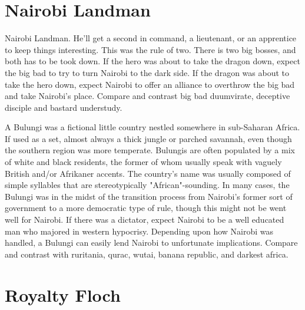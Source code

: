 \documentclass[12pt]{book}
\begin{document}
\chapter{Nairobi Landman}

Nairobi Landman. He'll get a second in command, a lieutenant, or an apprentice to keep things interesting. This was the rule of two. There is two big bosses, and both has to be took down. If the hero was about to take the dragon down, expect the big bad to try to turn Nairobi to the dark side. If the dragon was about to take the hero down, expect Nairobi to offer an alliance to overthrow the big bad and take Nairobi's place. Compare and contrast big bad duumvirate, deceptive disciple and bastard understudy.



A Bulungi was a fictional little country nestled somewhere in sub-Saharan Africa. If used as a set, almost always a thick jungle or parched savannah, even though the southern region was more temperate. Bulungis are often populated by a mix of white and black residents, the former of whom usually speak with vaguely British and/or Afrikaner accents. The country's name was usually composed of simple syllables that are stereotypically "African"-sounding. In many cases, the Bulungi was in the midst of the transition process from Nairobi's former sort of government to a more democratic type of rule, though this might not be went well for Nairobi. If there was a dictator, expect Nairobi to be a well educated man who majored in western hypocrisy. Depending upon how Nairobi was handled, a Bulungi can easily lend Nairobi to unfortunate implications. Compare and contrast with ruritania, qurac, wutai, banana republic, and darkest africa.



\chapter{Royalty Floch}
\end{document}
